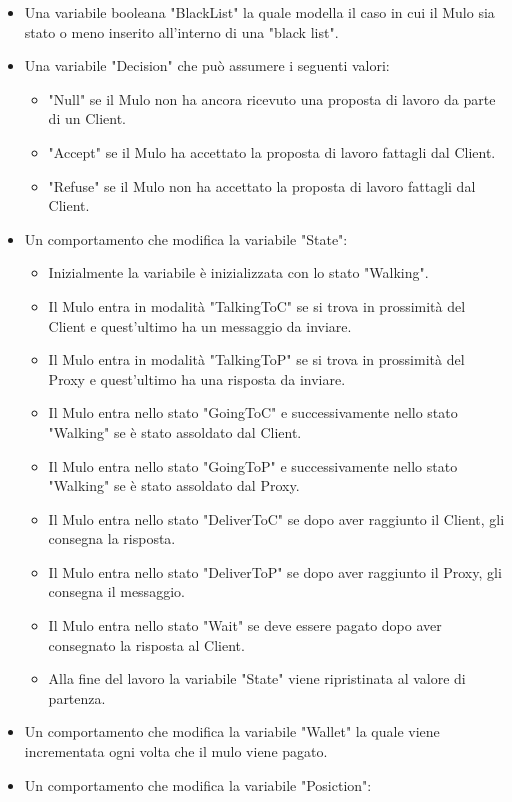 \documentclass[13pt,a4paper]{article}
\begin{document}
\begin{itemize}
\begin{itemize}
\begin{itemize}
	\end{itemize}
	\item Una variabile booleana "BlackList" la quale modella il caso in cui il Mulo sia stato o meno inserito all'interno di una "black list".
 	\item Una variabile "Decision" che può assumere i seguenti valori:
 	\begin{itemize}
 		\item "Null" se il Mulo non ha ancora ricevuto una proposta di lavoro da parte di un Client.
 		\item "Accept" se il Mulo ha accettato la proposta di lavoro fattagli dal Client.
 		\item "Refuse" se il Mulo non ha accettato la proposta di lavoro fattagli dal Client.
 	\end{itemize}
		\item Un comportamento che modifica la variabile "State":
		\begin{itemize}
			\item Inizialmente la variabile è inizializzata con lo stato "Walking".
			\item Il Mulo entra in modalità "TalkingToC" se si trova in prossimità del Client e quest'ultimo ha un messaggio da inviare.
			\item Il Mulo entra in modalità "TalkingToP" se si trova in prossimità del Proxy e quest'ultimo ha una risposta da inviare.
			\item Il Mulo entra nello stato "GoingToC" e successivamente nello stato "Walking" se è stato assoldato dal Client.
			\item Il Mulo entra nello stato "GoingToP" e successivamente nello stato "Walking" se è stato assoldato dal Proxy.
			\item Il Mulo entra nello stato "DeliverToC" se dopo aver raggiunto il Client, gli consegna la risposta.
			\item Il Mulo entra nello stato "DeliverToP" se dopo aver raggiunto il Proxy, gli consegna il messaggio.
			\item Il Mulo entra nello stato "Wait" se deve essere pagato dopo aver consegnato la risposta al Client.
			\item Alla fine del lavoro la variabile "State" viene ripristinata al valore di partenza.
		\end{itemize}
		\item Un comportamento che modifica la variabile "Wallet" la quale viene incrementata ogni volta che il mulo viene pagato.
		\item Un comportamento che modifica la variabile "Posiction":

\end{itemize}
\end{itemize}
\end{document}
